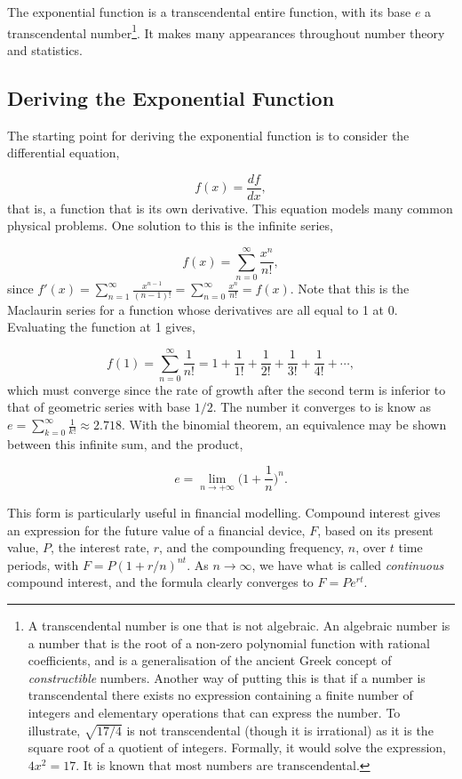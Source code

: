 \documentclass[11pt]{amsart}
\begin{document}
The exponential function is a transcendental entire function, with its base $e$ a transcendental number\footnote{A transcendental number is one that is not algebraic. An algebraic number is a number that is the root of a non-zero polynomial function with rational coefficients, and is a generalisation of the ancient Greek concept of \emph{constructible} numbers. Another way of putting this is that if a number is transcendental there exists no expression containing a finite number of integers and elementary operations that can express the number. To illustrate, $\sqrt{17/4}$ is not transcendental (though it is irrational) as it is the square root of a quotient of integers. Formally, it would solve the expression, $4x^2 = 17$. It is known that most numbers are transcendental.}. It makes many appearances throughout number theory and statistics.

\subsection{Deriving the Exponential Function}

The starting point for deriving the exponential function is to consider the differential equation,

$$f(x) = \frac{df}{dx},$$ that is, a function that is its own derivative. This equation models many common physical problems. One solution to this is the infinite series,

$$f(x) = \sum_{n=0}^{\infty} \frac{x^n}{n!},$$ since $f'(x) = \sum_{n=1}^{\infty} \frac{x^{n-1}}{(n - 1)!} = \sum_{n=0}^{\infty} \frac{x^{n}}{n!} = f(x)$. Note that this is the Maclaurin series for a function whose derivatives are all equal to 1 at 0. Evaluating the function at 1 gives,

$$f(1) = \sum_{n=0}^{\infty} \frac{1}{n!} = 1 + \frac{1}{1!} + \frac{1}{2!} + \frac{1}{3!} + \frac{1}{4!} + \cdots,$$ which must converge since the rate of growth after the second term is inferior to that of geometric series with base $1/2$. The number it converges to is know as $e = \sum_{k=0}^{\infty}  \frac{1}{k!} \approx 2.718.$ With the binomial theorem, an equivalence may be shown between this infinite sum, and the product,

$$e = \lim_{n \to +\infty} \bigg(1 + \frac{1}{n}\bigg)^n.$$

This form is particularly useful in financial modelling. Compound interest gives an expression for the future value of a financial device, $F$, based on its present value, $P$, the interest rate, $r$, and the compounding frequency, $n$, over $t$ time periods, with $F = P(1 + r/n)^{nt}$. As $n\to\infty$, we have what is called \emph{continuous} compound interest, and the formula clearly converges to $F = Pe^{rt}$.
\end{document}
